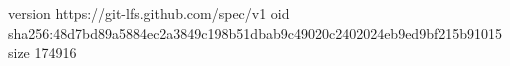 version https://git-lfs.github.com/spec/v1
oid sha256:48d7bd89a5884ec2a3849c198b51dbab9c49020c2402024eb9ed9bf215b91015
size 174916
